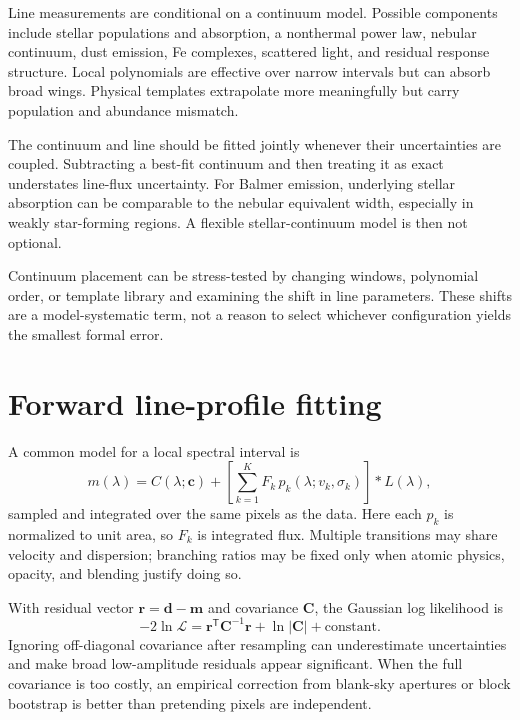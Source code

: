 Line measurements are conditional on a continuum model.  Possible components include
stellar populations and absorption, a nonthermal power law, nebular continuum, dust
emission, Fe complexes, scattered light, and residual response structure.  Local
polynomials are effective over narrow intervals but can absorb broad wings.  Physical
templates extrapolate more meaningfully but carry population and abundance mismatch.

The continuum and line should be fitted jointly whenever their uncertainties are
coupled.  Subtracting a best-fit continuum and then treating it as exact understates
line-flux uncertainty.  For Balmer emission, underlying stellar absorption can be
comparable to the nebular equivalent width, especially in weakly star-forming regions.
A flexible stellar-continuum model is then not optional.

Continuum placement can be stress-tested by changing windows, polynomial order, or
template library and examining the shift in line parameters.  These shifts are a
model-systematic term, not a reason to select whichever configuration yields the
smallest formal error.

\section{Forward line-profile fitting}

A common model for a local spectral interval is
\begin{equation}
 m(\lambda)=C(\lambda;\boldsymbol{c})+
 \left[\sum_{k=1}^{K}F_k\,
 p_k(\lambda;v_k,\sigma_k)\right]*L(\lambda),
 \label{eq:spectral-forward-model}
\end{equation}
sampled and integrated over the same pixels as the data.  Here each $p_k$ is normalized
to unit area, so $F_k$ is integrated flux.  Multiple transitions may share velocity
and dispersion; branching ratios may be fixed only when atomic physics, opacity, and
blending justify doing so.

With residual vector $\boldsymbol{r}=\boldsymbol{d}-\boldsymbol{m}$ and covariance
$\boldsymbol{C}$, the Gaussian log likelihood is
\begin{equation}
 -2\ln\mathcal{L}=
 \boldsymbol{r}^{\mathsf T}\boldsymbol{C}^{-1}\boldsymbol{r}
 +\ln|\boldsymbol{C}|+\mathrm{constant}.
 \label{eq:gaussian-correlated-likelihood}
\end{equation}
Ignoring off-diagonal covariance after resampling can underestimate uncertainties and
make broad low-amplitude residuals appear significant.  When the full covariance is
too costly, an empirical correction from blank-sky apertures or block bootstrap is
better than pretending pixels are independent.

